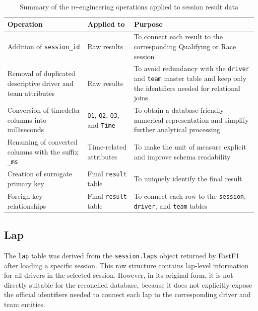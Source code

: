 \documentclass[12pt,a4paper]{article}
\begin{document}
	\begin{table}[H]
		\centering
		\caption{Summary of the re-engineering operations applied to session result data}
		\renewcommand{\arraystretch}{1.2}
		\begin{tabularx}{\textwidth}{>{\raggedright\arraybackslash}p{4.1cm} >{\raggedright\arraybackslash}p{3.2cm} >{\raggedright\arraybackslash}X}
			\toprule
			\textbf{Operation} & \textbf{Applied to} & \textbf{Purpose} \\
			\midrule
			Addition of \texttt{session\_id} & Raw results & To connect each result to the corresponding Qualifying or Race session \\
			\addlinespace
			Removal of duplicated descriptive driver and team attributes & Raw results & To avoid redundancy with the \texttt{driver} and \texttt{team} master table and keep only the identifiers needed for relational joins \\
			\addlinespace
			Conversion of timedelta columns into milliseconds & \texttt{Q1}, \texttt{Q2}, \texttt{Q3}, and \texttt{Time} & To obtain a database-friendly numerical representation and simplify further analytical processing \\
			\addlinespace
			Renaming of converted columns with the suffix \texttt{\_ms} & Time-related attributes & To make the unit of measure explicit and improve schema readability \\
			\addlinespace
			Creation of surrogate primary key & Final \texttt{result} table & To uniquely identify the final result \\
			\addlinespace
			Foreign key relationships & Final \texttt{result} table & To connect each row to the \texttt{session}, \texttt{driver}, and \texttt{team} tables \\
			\bottomrule
		\end{tabularx}
	\end{table}
	
	
	\subsection{Lap}
	
	The \texttt{lap} table was derived from the \texttt{session.laps} object returned by FastF1 after loading a specific session.
	This raw structure contains lap-level information for all drivers in the selected session.
	However, in its original form, it is not directly suitable for the reconciled database, because it does not explicitly expose the official identifiers needed to connect each lap to the corresponding driver and team entities.
	
\end{document}
